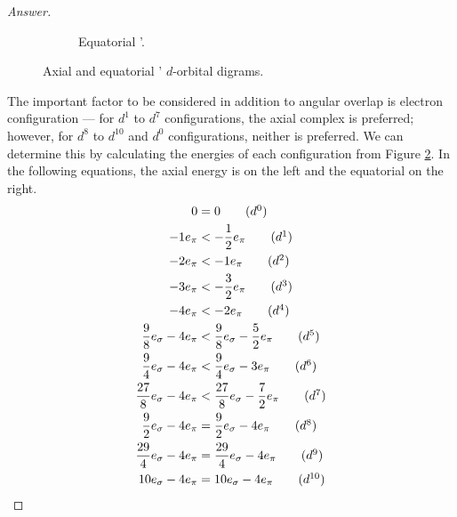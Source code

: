 \documentclass[../psets.tex]{subfiles}
\begin{document}
\begin{enumerate}[label={\Roman*)}]
\begin{enumerate}[label={\textbf{10.\arabic*}}]
\begin{enumerate}[label={\textbf{\alph*.}}]
\begin{proof}[Answer]
\begin{figure}[H]
\begin{subfigure}[b]{0.4\linewidth}
                        \caption{Equatorial '.}
                        \label{fig:orbitalDiagram-ML4Lb}
                    \end{subfigure}
                    \caption{Axial and equatorial ' $d$-orbital digrams.}
                    \label{fig:orbitalDiagram-ML4L}
                \end{figure}
                The important factor to be considered in addition to angular overlap is electron configuration --- for $d^1$ to $d^7$ configurations, the axial complex is preferred; however, for $d^8$ to $d^{10}$ and $d^0$ configurations, neither is preferred. We can determine this by calculating the energies of each configuration from Figure \ref{fig:orbitalDiagram-ML4L}. In the following equations, the axial energy is on the left and the equatorial on the right.
                \begin{align*}
                    0 &= 0\tag{$d^0$}\\
                    -1e_\pi &< -\frac{1}{2}e_\pi\tag{$d^1$}\\
                    -2e_\pi &< -1e_\pi\tag{$d^2$}\\
                    -3e_\pi &< -\frac{3}{2}e_\pi\tag{$d^3$}\\
                    -4e_\pi &< -2e_\pi\tag{$d^4$}\\
                    \frac{9}{8}e_\sigma-4e_\pi &< \frac{9}{8}e_\sigma-\frac{5}{2}e_\pi\tag{$d^5$}\\
                    \frac{9}{4}e_\sigma-4e_\pi &< \frac{9}{4}e_\sigma-3e_\pi\tag{$d^6$}\\
                    \frac{27}{8}e_\sigma-4e_\pi &< \frac{27}{8}e_\sigma-\frac{7}{2}e_\pi\tag{$d^7$}\\
                    \frac{9}{2}e_\sigma-4e_\pi &= \frac{9}{2}e_\sigma-4e_\pi\tag{$d^8$}\\
                    \frac{29}{4}e_\sigma-4e_\pi &= \frac{29}{4}e_\sigma-4e_\pi\tag{$d^9$}\\
                    10e_\sigma-4e_\pi &= 10e_\sigma-4e_\pi\tag{$d^{10}$}\\

\end{align*}
\end{proof}
\end{enumerate}
\end{enumerate}
\end{enumerate}
\end{document}
